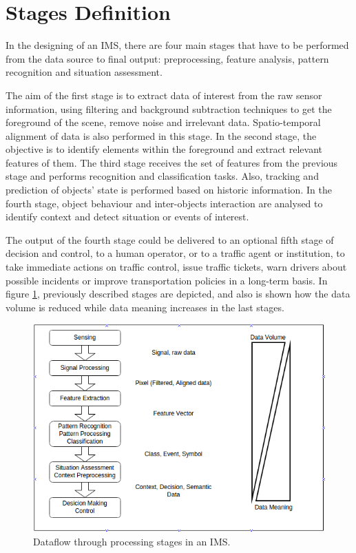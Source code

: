 \documentclass[10pt,twocolumn,letterpaper]{article}
\begin{document}
\section{Stages Definition}
In the designing of an IMS, there are four main stages that have to be performed from the data source to final output: preprocessing, feature analysis, pattern recognition and situation assessment.

The aim of the first stage is to extract data of interest from the raw sensor information, using filtering and background subtraction techniques to get the foreground of the scene, remove noise and irrelevant data. Spatio-temporal alignment of data is also performed in this stage. In the second stage, the objective is to identify elements within the foreground and extract relevant features of them. The third stage receives the set of features from the previous stage and performs recognition and classification tasks. Also, tracking and prediction of objects' state is performed based on historic information. In the fourth stage, object behaviour and inter-objects interaction are analysed to identify context and detect situation or events of interest.

The output of the fourth stage could be delivered to an optional fifth stage of decision and control, to a human operator, or to a traffic agent or institution, to take immediate actions on traffic control, issue traffic tickets, warn drivers about possible incidents or improve transportation policies in a long-term basis. In figure \ref{proc_stages}, previously described stages are depicted, and also is shown how the data volume is reduced while data meaning increases in the last stages.

\begin{figure}[ht!]
\centering
\includegraphics[scale=0.35]{../fig/3/proc_stages.png}
\caption{Dataflow through processing stages in an IMS.}
\label{proc_stages}
\end{figure}
\end{document}
